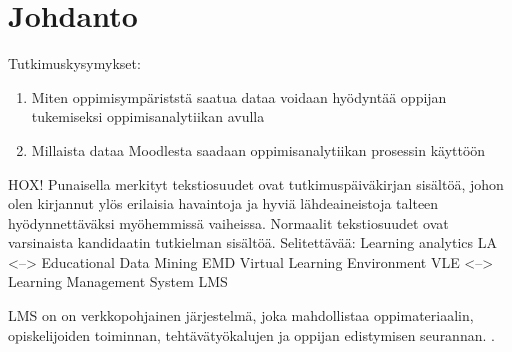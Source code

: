 \chapter{Johdanto\label{johdanto}}

Tutkimuskysymykset:
\begin{enumerate}
    \item Miten oppimisympäriststä saatua dataa voidaan hyödyntää oppijan tukemiseksi oppimisanalytiikan avulla
    \item Millaista dataa Moodlesta saadaan oppimisanalytiikan prosessin käyttöön
\end{enumerate}

HOX! Punaisella merkityt tekstiosuudet ovat tutkimuspäiväkirjan sisältöä, johon olen kirjannut ylös erilaisia havaintoja ja hyviä lähdeaineistoja talteen hyödynnettäväksi myöhemmissä vaiheissa. Normaalit tekstiosuudet ovat varsinaista kandidaatin tutkielman sisältöä.
\color{red}
Selitettävää:
Learning analytics LA <--> Educational Data Mining EMD \citep{romeroEducationalDataMining2010}
Virtual Learning Environment VLE <--> Learning Management System LMS

LMS on on verkkopohjainen järjestelmä, joka mahdollistaa oppimateriaalin, opiskelijoiden toiminnan, tehtävätyökalujen ja oppijan edistymisen seurannan. \citep{mohdChoosingRightLearning2016}. \citep{romeroSurveyPreProcessingEducational2014}
\color{black}
